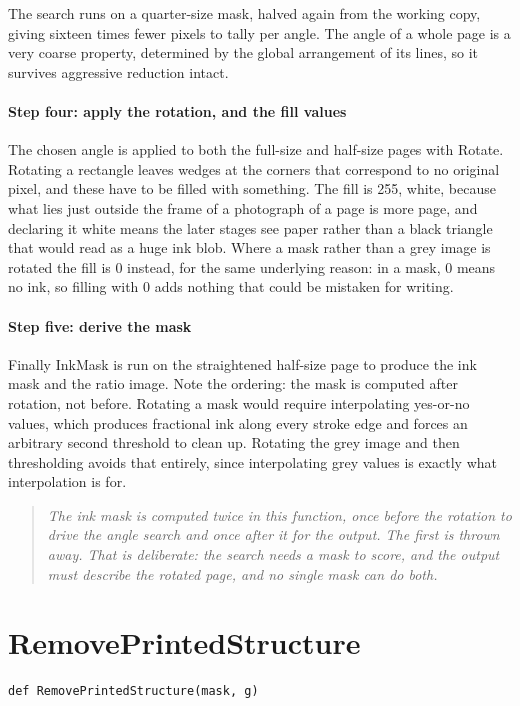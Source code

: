 The search runs on a quarter-size mask, halved again from the working copy, giving sixteen times fewer pixels to tally per angle. The angle of a whole page is a very coarse property, determined by the global arrangement of its lines, so it survives aggressive reduction intact.


\paragraph{Step four: apply the rotation, and the fill values}
The chosen angle is applied to both the full-size and half-size pages with Rotate. Rotating a rectangle leaves wedges at the corners that correspond to no original pixel, and these have to be filled with something. The fill is 255, white, because what lies just outside the frame of a photograph of a page is more page, and declaring it white means the later stages see paper rather than a black triangle that would read as a huge ink blob. Where a mask rather than a grey image is rotated the fill is 0 instead, for the same underlying reason: in a mask, 0 means no ink, so filling with 0 adds nothing that could be mistaken for writing.


\paragraph{Step five: derive the mask}
Finally InkMask is run on the straightened half-size page to produce the ink mask and the ratio image. Note the ordering: the mask is computed after rotation, not before. Rotating a mask would require interpolating yes-or-no values, which produces fractional ink along every stroke edge and forces an arbitrary second threshold to clean up. Rotating the grey image and then thresholding avoids that entirely, since interpolating grey values is exactly what interpolation is for.


\begin{quote}\small\itshape The ink mask is computed twice in this function, once before the rotation to drive the angle search and once after it for the output. The first is thrown away. That is deliberate: the search needs a mask to score, and the output must describe the rotated page, and no single mask can do both.\end{quote}

\section{RemovePrintedStructure}
\begin{lstlisting}[style=sig]
def RemovePrintedStructure(mask, g)
\end{lstlisting}

